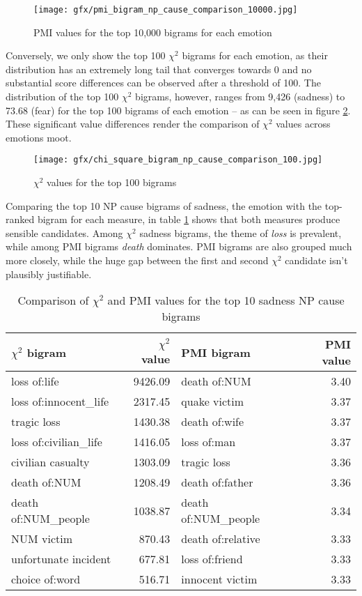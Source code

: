 \begin{figure}[bth]
\texttt{[image: gfx/pmi\_bigram\_np\_cause\_comparison\_10000.jpg]}
\caption{PMI values for the top 10,000 bigrams for each emotion}\label{fig:pmi distribution}
\end{figure}

Conversely, we only show the top 100 $\chi^{2}$ bigrams for each emotion, as their distribution has an extremely long tail that converges towards 0 and no substantial score differences can be observed after a threshold of 100. The distribution of the top 100 $\chi^{2}$ bigrams, however, ranges from 9,426 (sadness) to 73.68 (fear) for the top 100 bigrams of each emotion -- as can be seen in figure \ref{fig:chi-square distribution}. These significant value differences render the comparison of $\chi^{2}$ values across emotions moot.

\begin{figure}[bth]
\texttt{[image: gfx/chi\_square\_bigram\_np\_cause\_comparison\_100.jpg]}
\caption{$\chi^{2}$ values for the top 100 bigrams}\label{fig:chi-square distribution}
\end{figure}

Comparing the top 10 NP cause bigrams of sadness, the emotion with the top-ranked bigram for each measure, in table \ref{tab:chi-pmi sadness} shows that both measures produce sensible candidates. Among $\chi^{2}$ sadness bigrams, the theme of \textit{loss} is prevalent, while among PMI bigrams \textit{death} dominates. PMI bigrams are also grouped much more closely, while the huge gap between the first and second $\chi^{2}$ candidate isn't plausibly justifiable.

\begin{table}[h]
\centering
\begin{tabular}{l|r|l|r}
{\bf $\chi^{2}$ bigram} & {\bf $\chi^{2}$ value} & {\bf PMI bigram} & {\bf PMI value} \\\hline
loss of:life & 9426.09 & death of:NUM & 3.40 \\
loss of:innocent\_life  & 2317.45 & quake victim & 3.37 \\
tragic loss             & 1430.38 & death of:wife & 3.37 \\
loss of:civilian\_life  & 1416.05 & loss of:man & 3.37 \\
civilian casualty       & 1303.09 & tragic loss & 3.36 \\
death of:NUM            & 1208.49 & death of:father & 3.36 \\
death of:NUM\_people & 1038.87 & death of:NUM\_people & 3.34 \\
NUM victim           & 870.43 & death of:relative & 3.33 \\
unfortunate incident    & 677.81 & loss of:friend & 3.33 \\
choice of:word          & 516.71 & innocent victim & 3.33 
\end{tabular}
\caption{Comparison of $\chi^{2}$ and PMI values for the top 10 sadness NP cause bigrams}
\label{tab:chi-pmi sadness}
\end{table}

